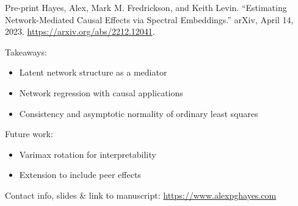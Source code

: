 \documentclass[aspectratio=169]{beamer}
\theoremstyle{remark}
\begin{document}
\begin{frame}
    \begin{block}{Pre-print}
        Hayes, Alex, Mark M. Fredrickson, and Keith Levin. “Estimating Network-Mediated Causal Effects via Spectral Embeddings.” arXiv, April 14, 2023. \url{https://arxiv.org/abs/2212.12041}.
    \end{block}

    Takeaways:
    \begin{itemize}
        \item Latent network structure as a mediator
        \item Network regression with causal applications
        \item Consistency and asymptotic normality of ordinary least squares
    \end{itemize}

    Future work:
    \begin{itemize}
        \item Varimax rotation for interpretability
        \item Extension to include peer effects
    \end{itemize}

    Contact info, slides \& link to manuscript: \href{www.alexpghayes.com}{https://www.alexpghayes.com}
\end{frame}

\appendix
\end{document}
